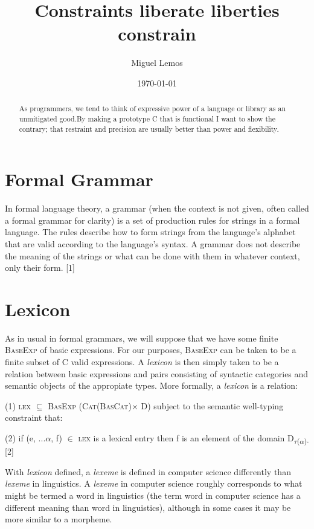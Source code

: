 \documentclass[twocolumn,10ptr]{article}
\author{Miguel Lemos}
\date{\today}
\title{Constraints liberate liberties constrain}
\begin{document}
	
	\twocolumn
	\setlength{\columnsep}{20pt}
	\maketitle
	
	\begin{abstract}
		As programmers, we tend to think of expressive power of a language or library as an unmitigated good.By making a prototype C  that is functional I want to show the contrary; that restraint and precision are usually better than power and flexibility.
			\end{abstract}
	
	
	
	\section{Formal Grammar}
	In formal language theory, a grammar (when the context is not given, often called a formal grammar for clarity) is a set of production rules for strings in a formal language. The rules describe how to form strings from the language's alphabet that are valid according to the language's syntax. A grammar does not describe the meaning of the strings or what can be done with them in whatever context, only their form.
	[1]
	
	
	
	\section{Lexicon}
	As in usual in formal grammars, we will suppose that we have some finite \textsc{BaseExp} of basic expressions. For our purposes, \textsc{BaseExp}  can be taken to be a finite subset of   C valid expressions. A \textit{lexicon} is then simply taken to be a relation between basic expressions and pairs consisting of syntactic categories and semantic objects of the appropiate types.
	More formally, a \textit{lexicon} is a relation:
	
	(1) \textsc{ lex} \( \subseteq \)  \textsc{ BasExp} (\textsc{Cat}(\textsc{BasCat})\(\times\) D)
	subject to the semantic well-typing constraint that:
	
	(2) if (e, ...\( \alpha \), f) \( \in \)   \textsc{ lex} is a lexical entry then f is an element of the domain D\textsubscript{\(\tau \)(\( \alpha \))\(\cdot\)} [2]
	
	With \textit{lexicon} defined, a \textit{lexeme} is defined in computer science differently than  \textit{lexeme}  in linguistics. A  \textit{lexeme}  in computer science roughly corresponds to what might be termed a word in linguistics (the term word in computer science has a different meaning than word in linguistics), although in some cases it may be more similar to a morpheme.
	
\end{document}
